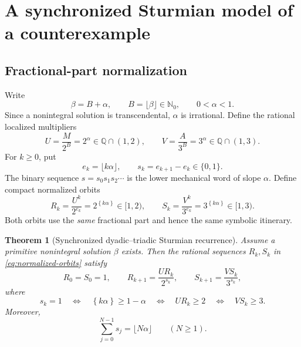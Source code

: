 \documentclass[11pt,oneside]{article}
\newtheorem{theorem}{Theorem}[section]
\theoremstyle{definition}
\theoremstyle{remark}
\newcommand{\Nzero}{\mathbb N_0}
\newcommand{\Q}{\mathbb Q}
\newcommand{\fract}[1]{\left\{#1\right\}}
\begin{document}
\section{A synchronized Sturmian model of a counterexample}
\label{sec:sturmian}

\subsection{Fractional-part normalization}

Write
\[
  \beta=B+\alpha,
  \qquad B=\lfloor\beta\rfloor\in\Nzero,
  \qquad 0<\alpha<1.
\]
Since a nonintegral solution is transcendental, $\alpha$ is irrational.  Define the rational
localized multipliers
\begin{equation}\label{eq:UV}
  U=\frac{M}{2^B}=2^\alpha\in\Q\cap(1,2),
  \qquad
  V=\frac{A}{3^B}=3^\alpha\in\Q\cap(1,3).
\end{equation}
For $k\ge0$, put
\[
  e_k=\lfloor k\alpha\rfloor,
  \qquad
  s_k=e_{k+1}-e_k\in\{0,1\}.
\]
The binary sequence $s=s_0s_1s_2\cdots$ is the lower mechanical word of slope $\alpha$.
Define compact normalized orbits
\begin{equation}\label{eq:normalized-orbits}
  R_k=\frac{U^k}{2^{e_k}}=2^{\fract{k\alpha}}\in[1,2),
  \qquad
  S_k=\frac{V^k}{3^{e_k}}=3^{\fract{k\alpha}}\in[1,3).
\end{equation}
Both orbits use the \emph{same} fractional part and hence the same symbolic itinerary.

\begin{theorem}[Synchronized dyadic--triadic Sturmian recurrence]\label{thm:sturmian-recurrence}
Assume a primitive nonintegral solution $\beta$ exists.  Then the rational sequences
$R_k,S_k$ in \eqref{eq:normalized-orbits} satisfy
\begin{equation}\label{eq:sturmian-recurrence}
  R_0=S_0=1,
  \qquad
  R_{k+1}=\frac{U R_k}{2^{s_k}},
  \qquad
  S_{k+1}=\frac{V S_k}{3^{s_k}},
\end{equation}
where
\begin{equation}\label{eq:sturmian-threshold}
  s_k=1
  \quad\Longleftrightarrow\quad
  \fract{k\alpha}\ge1-\alpha
  \quad\Longleftrightarrow\quad
  UR_k\ge2
  \quad\Longleftrightarrow\quad
  VS_k\ge3.
\end{equation}
Moreover,
\begin{equation}\label{eq:prefix-count}
  \sum_{j=0}^{N-1}s_j=\lfloor N\alpha\rfloor
  \qquad(N\ge1).
\end{equation}
\end{theorem}
\end{document}
